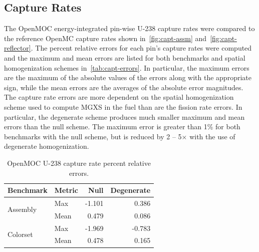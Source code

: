 \subsection{Capture Rates}
\label{subsec:capt-rates}

The OpenMOC energy-integrated pin-wise U-238 capture rates were compared to the reference OpenMC capture rates shown in~\autoref{fig:capt-assm} and~\autoref{fig:capt-reflector}. The percent relative errors for each pin's capture rates were computed and the maximum and mean errors are listed for both benchmarks and spatial homogenization schemes in~\autoref{tab:capt-errors}. In particular, the maximum errors are the maximum of the absolute values of the errors along with the appropriate sign, while the mean errors are the averages of the absolute error magnitudes. The capture rate errors are more dependent on the spatial homogenization scheme used to compute MGXS in the fuel than are the fission rate errors. In particular, the degenerate scheme produces much smaller maximum and mean errors than the null scheme. The maximum error is greater than 1\% for both benchmarks with the null scheme, but is reduced by 2 -- 5$\times$ with the use of degenerate homogenization.

\begin{table}[h!]
  \centering
  \caption{OpenMOC U-238 capture rate percent relative errors.}
  \label{tab:capt-errors} 
  \begin{tabular}{l l r r}
  \toprule
  \textbf{Benchmark} & \textbf{Metric} & \textbf{Null} & \textbf{Degenerate} \\
  \midrule
  \multirow{2}{*}{Assembly} & Max  & -1.101 &  0.386 \\
                            & Mean &  0.479 &  0.086 \\
  \midrule
  \multirow{2}{*}{Colorset} & Max  & -1.969 & -0.783 \\
                            & Mean &  0.478 &  0.165 \\
  \bottomrule
\end{tabular}
\end{table}

